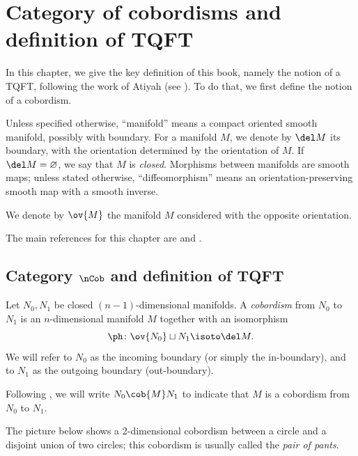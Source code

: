 \chapter{Category of cobordisms and definition of TQFT}\label{c:cobordisms}

In this chapter, we give the key definition of this book, namely the notion of a
TQFT, following the work of Atiyah (see \cite{atiyah}). To do that, we first
define the notion of a cobordism.

Unless specified otherwise, ``manifold'' means a compact oriented smooth
manifold, possibly with boundary. For a manifold $M$, we denote by $\del M$ its
boundary, with the orientation determined by the orientation of $M$. If $\del
M=\varnothing$, we say that $M$ is \emph{closed}. Morphisms between manifolds
are smooth maps; unless stated otherwise, ``diffeomorphism'' means an
orientation-preserving smooth map with a smooth inverse.

We denote by $\ov{M}$ the manifold $M$ considered with the
opposite orientation.

The main references for this chapter are \cite{kock} and
\cite{milnor-h-cobordism}.

\section{Category $\nCob$ and definition of TQFT}\label{s:TQFT-def}
\begin{definition}\label{d:cobordism}
Let $N_0, N_1$ be closed $(n-1)$-dimensional manifolds. A \emph{cobordism}
from $N_0$ to $N_1$ is an $n$-dimensional manifold $M$ together with
an isomorphism
$$
  \ph\colon \ov{N_0}\sqcup N_1 \isoto \del M.
$$
We will refer to $N_0$ as the incoming boundary (or simply the in-boundary),
and to $N_1$ as the outgoing boundary (out-boundary).

Following \cite{kock}, we will write $N_0\cob{M} N_1$ to indicate that $M$ is a
cobordism from $N_0$ to $N_1$.
\end{definition}

The picture below shows a 2-dimensional cobordism between a circle and a
disjoint union of two circles; this cobordism is usually called the \emph{pair
of pants}.
\begin{center}
\end{center}

